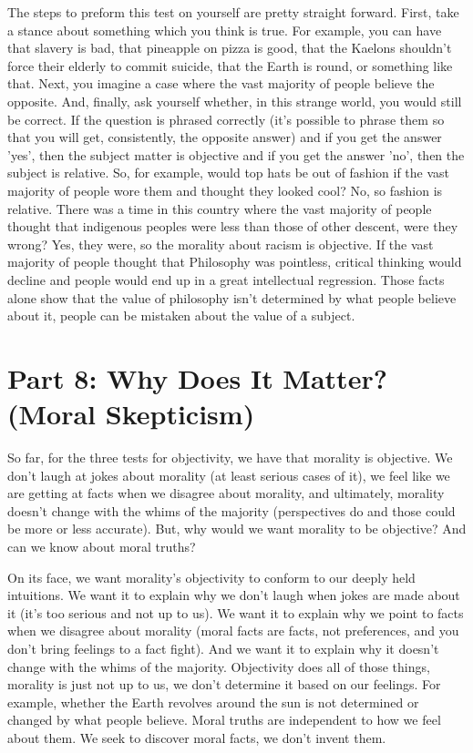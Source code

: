 The steps to preform this test on yourself are pretty straight forward. First, take a stance about something which you think is true. For example, you can have that slavery is bad, that pineapple on pizza is good, that the Kaelons shouldn't force their elderly to commit suicide, that the Earth is round, or something like that. Next, you imagine a case where the vast majority of people believe the opposite. And, finally, ask yourself whether, in this strange world, you would still be correct.  If the question is phrased correctly (it's possible to phrase them so that you will get, consistently, the opposite answer) and if you get the answer 'yes', then the subject matter is objective and if you get the answer 'no', then the subject is relative. So, for example, would top hats be out of fashion if the vast majority of people wore them and thought they looked cool? No, so fashion is relative. There was a time in this country where the vast majority of people thought that indigenous peoples were less than those of other descent, were they wrong? Yes, they were, so the morality about racism is objective. If the vast majority of people thought that Philosophy was pointless, critical thinking would decline and people would end up in a great intellectual regression. Those facts alone show that the value of philosophy isn't determined by what people believe about it, people can be mistaken about the value of a subject. 

\chapter{Part 8: Why Does It Matter? (Moral Skepticism)}

So far, for the three tests for objectivity, we have that morality is objective. We don't laugh at jokes about morality (at least serious cases of it), we feel like we are getting at facts when we disagree about morality, and ultimately, morality doesn't change with the whims of the majority (perspectives do and those could be more or less accurate). But, why would we want morality to be objective? And can we know about moral truths?

On its face, we want morality's objectivity to conform to our deeply held intuitions. We want it to explain why we don't laugh when jokes are made about it (it's too serious and not up to us). We want it to explain why we point to facts when we disagree about morality (moral facts are facts, not preferences, and you don't bring feelings to a fact fight). And we want it to explain why it doesn't change with the whims of the majority. Objectivity does all of those things, morality is just not up to us, we don't determine it based on our feelings. For example, whether the Earth revolves around the sun is not determined or changed by what people believe. Moral truths are independent to how we feel about them. We seek to discover moral facts, we don't invent them.

